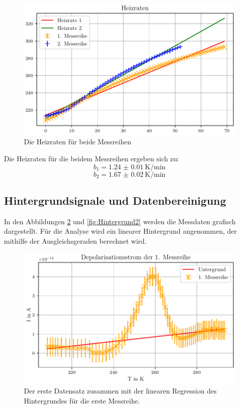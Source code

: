 \begin{figure}[H]
    \centering
    \includegraphics[width=\textwidth]{plots/A_heizraten.pdf}
    \caption{Die Heizraten für beide Messreihen}
    \label{fig:Heizraten}
\end{figure}

Die Heizraten für die beidem Messreihen ergeben sich zu:
\begin{equation}
b_1 =  \qty{1.24(1)}{\kelvin\per\minute}
\end{equation}
\begin{equation}
b_2 = \qty{1.67(2)}{\kelvin\per\minute}
\end{equation}

\subsection{Hintergrundsignale und Datenbereinigung}
In den Abbildungen \ref{fig:Hintergrund1} und \ref{fig:Hintergrund2} werden die Messdaten grafisch dargestellt.
Für die Analyse wird ein linearer Hintergrund angenommen, der mithilfe der Ausgleichsgeraden berechnet wird.

\begin{figure}[H]
    \centering
    \includegraphics[width=\textwidth]{plots/B_messreihe1.pdf}
    \caption{Der erste Datensatz zusammen mit der linearen Regression des Hintergrundes für die erste Messreihe.}
    \label{fig:Hintergrund1}
\end{figure}

